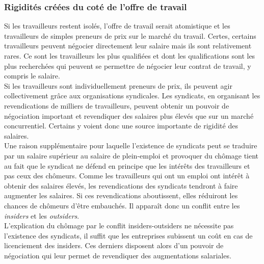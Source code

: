 \documentclass[10pt]{book}
\begin{document}
\subsubsection{Rigidités créées du coté de l'offre de travail}
Si les travailleurs restent isolés, l'offre de travail serait atomistique et les travailleurs de simples preneurs de prix sur le marché du travail. Certes, certains travailleurs peuvent négocier directement leur salaire mais ils sont relativement rares. Ce sont les travailleurs les plus qualifiées et dont les qualifications sont les plus recherchées qui peuvent se permettre de négocier leur contrat de travail, y compris le salaire. \\
Si les travailleurs sont individuellement preneurs de prix, ils peuvent agir collectivement grâce aux organisations syndicales. Les syndicats, en organisant les revendications de milliers de travailleurs, peuvent obtenir un pouvoir de négociation important et revendiquer des salaires plus élevés que sur un marché concurrentiel. Certains y voient donc une source importante de rigidité des salaires. \\
Une raison supplémentaire pour laquelle l'existence de syndicats peut se traduire par un salaire supérieur au salaire de plein-emploi et provoquer du chômage tient au fait que le syndicat ne défend en principe que les intérêts des travailleurs et pas ceux des chômeurs. Comme les travailleurs qui ont un emploi ont intérêt à obtenir des salaires élevés, les revendications des syndicats tendront à faire augmenter les salaires. Si ces revendications aboutissent, elles réduiront les chances de chômeurs d'être embauchés. Il apparaît donc un conflit entre les \textit{insiders} et les \textit{outsiders}. \\
L'explication du chômage par le conflit insiders-outsiders ne nécessite pas l'existence des syndicats, il suffit que les entreprises subissent un coût en cas de licenciement des insiders. Ces derniers disposent alors d'un pouvoir de négociation qui leur permet de revendiquer des augmentations salariales.
\end{document}
